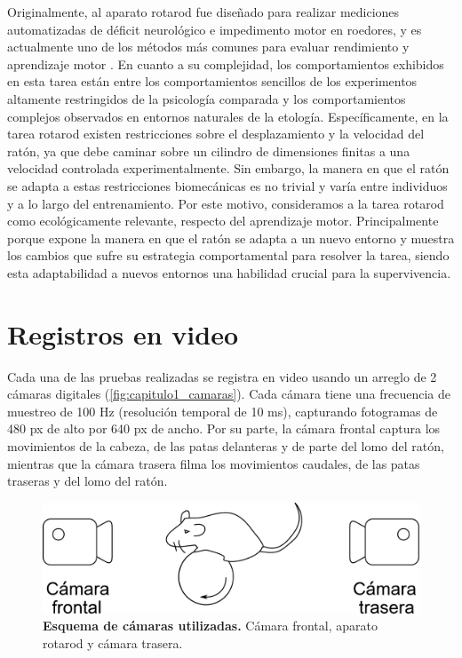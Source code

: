 Originalmente, al aparato rotarod fue diseñado para realizar mediciones automatizadas de déficit neurológico e impedimento motor en roedores, y es actualmente uno de los métodos más comunes para evaluar rendimiento y aprendizaje motor \cite{dunham_rotarod, mouse_tests}. En cuanto a su complejidad, los comportamientos exhibidos en esta tarea están entre los comportamientos sencillos de los experimentos altamente restringidos de la psicología comparada y los comportamientos complejos observados en entornos naturales de la etología. Específicamente, en la tarea rotarod existen restricciones sobre el desplazamiento y la velocidad del ratón, ya que debe caminar sobre un cilindro de dimensiones finitas a una velocidad controlada experimentalmente. Sin embargo, la manera en que el ratón se adapta a estas restricciones biomecánicas es no trivial y varía entre individuos y a lo largo del entrenamiento. Por este motivo, consideramos a la tarea rotarod como ecológicamente relevante, respecto del aprendizaje motor. Principalmente porque expone la manera en que el ratón se adapta a un nuevo entorno y muestra los cambios que sufre su estrategia comportamental para resolver la tarea, siendo esta adaptabilidad a nuevos entornos una habilidad crucial para la supervivencia.

\section{Registros en video}\label{sec:video}

Cada una de las pruebas realizadas se registra en video usando un arreglo de 2 cámaras digitales (\autoref{fig:capitulo1_camaras}). Cada cámara tiene una frecuencia de muestreo de 100 Hz (resolución temporal de 10 ms), capturando fotogramas de 480 px de alto por 640 px de ancho. Por su parte, la cámara frontal captura los movimientos de la cabeza, de las patas delanteras y de parte del lomo del ratón, mientras que la cámara trasera filma los movimientos caudales, de las patas traseras y del lomo del ratón.

\begin{figure}[htbp]
    \centering
    \includegraphics[width=0.55\linewidth]{figuras/capitulo1/camaras.pdf}
    \caption{\textbf{Esquema de cámaras utilizadas.} Cámara frontal, aparato rotarod y cámara trasera.}
    \label{fig:capitulo1_camaras}
\end{figure}
